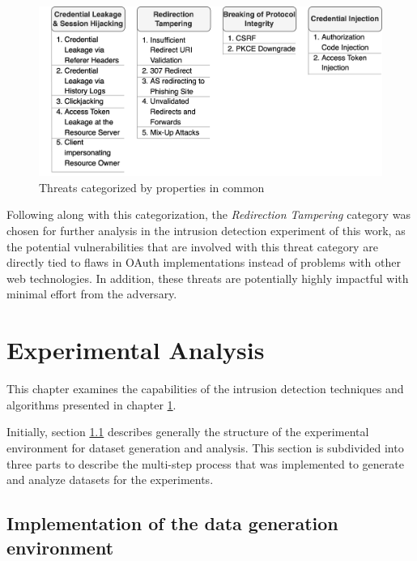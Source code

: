\documentclass[
    fontsize=12pt,
    headings=small,
    parskip=half,           %
    bibliography=totoc,
    numbers=noenddot,       %
    open=any,               %
    ]{scrreprt}
\begin{document}
\begin{figure}[H]
	\sffamily\footnotesize
	\includegraphics[width=1\textwidth]{pic/threat taxonomy.drawio.png}
	\unitlength=0.75mm
	\linethickness{0.4pt}
	\caption{Threats categorized by properties in common}
	\label{fig:threat_taxonomy}
\end{figure}

Following along with this categorization, the \emph{Redirection Tampering} category was chosen for further analysis in the intrusion detection experiment of this work, as the potential vulnerabilities that are involved with this threat category are directly tied to flaws in OAuth implementations instead of problems with other web technologies. In addition, these threats are potentially highly impactful with minimal effort from the adversary.

\chapter{Experimental Analysis}
\label{chap:experimental_analysis}
This chapter examines the capabilities of the intrusion detection techniques and algorithms presented in chapter \ref{chap:experimental_analysis}.

Initially, section \ref{sec:exp_setup} describes generally the structure of the experimental environment for dataset generation and analysis. This section is subdivided into three parts to describe the multi-step process that was implemented to generate and analyze datasets for the experiments.

\section{Implementation of the data generation environment}
\label{sec:exp_setup}
\end{document}
